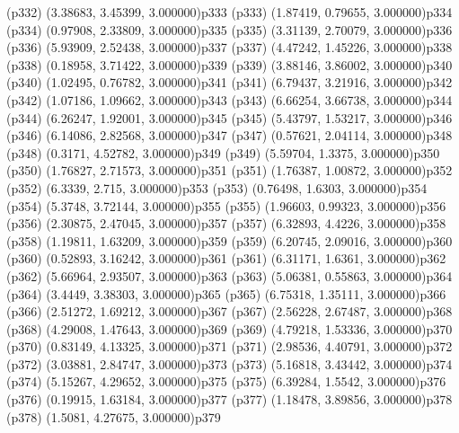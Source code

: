 \psdot(p332)
\psPoint(3.38683, 3.45399, 3.000000){p333}
\psdot(p333)
\psPoint(1.87419, 0.79655, 3.000000){p334}
\psdot(p334)
\psPoint(0.97908, 2.33809, 3.000000){p335}
\psdot(p335)
\psPoint(3.31139, 2.70079, 3.000000){p336}
\psdot(p336)
\psPoint(5.93909, 2.52438, 3.000000){p337}
\psdot(p337)
\psPoint(4.47242, 1.45226, 3.000000){p338}
\psdot(p338)
\psPoint(0.18958, 3.71422, 3.000000){p339}
\psdot(p339)
\psPoint(3.88146, 3.86002, 3.000000){p340}
\psdot(p340)
\psPoint(1.02495, 0.76782, 3.000000){p341}
\psdot(p341)
\psPoint(6.79437, 3.21916, 3.000000){p342}
\psdot(p342)
\psPoint(1.07186, 1.09662, 3.000000){p343}
\psdot(p343)
\psPoint(6.66254, 3.66738, 3.000000){p344}
\psdot(p344)
\psPoint(6.26247, 1.92001, 3.000000){p345}
\psdot(p345)
\psPoint(5.43797, 1.53217, 3.000000){p346}
\psdot(p346)
\psPoint(6.14086, 2.82568, 3.000000){p347}
\psdot(p347)
\psPoint(0.57621, 2.04114, 3.000000){p348}
\psdot(p348)
\psPoint(0.3171, 4.52782, 3.000000){p349}
\psdot(p349)
\psPoint(5.59704, 1.3375, 3.000000){p350}
\psdot(p350)
\psPoint(1.76827, 2.71573, 3.000000){p351}
\psdot(p351)
\psPoint(1.76387, 1.00872, 3.000000){p352}
\psdot(p352)
\psPoint(6.3339, 2.715, 3.000000){p353}
\psdot(p353)
\psPoint(0.76498, 1.6303, 3.000000){p354}
\psdot(p354)
\psPoint(5.3748, 3.72144, 3.000000){p355}
\psdot(p355)
\psPoint(1.96603, 0.99323, 3.000000){p356}
\psdot(p356)
\psPoint(2.30875, 2.47045, 3.000000){p357}
\psdot(p357)
\psPoint(6.32893, 4.4226, 3.000000){p358}
\psdot(p358)
\psPoint(1.19811, 1.63209, 3.000000){p359}
\psdot(p359)
\psPoint(6.20745, 2.09016, 3.000000){p360}
\psdot(p360)
\psPoint(0.52893, 3.16242, 3.000000){p361}
\psdot(p361)
\psPoint(6.31171, 1.6361, 3.000000){p362}
\psdot(p362)
\psPoint(5.66964, 2.93507, 3.000000){p363}
\psdot(p363)
\psPoint(5.06381, 0.55863, 3.000000){p364}
\psdot(p364)
\psPoint(3.4449, 3.38303, 3.000000){p365}
\psdot(p365)
\psPoint(6.75318, 1.35111, 3.000000){p366}
\psdot(p366)
\psPoint(2.51272, 1.69212, 3.000000){p367}
\psdot(p367)
\psPoint(2.56228, 2.67487, 3.000000){p368}
\psdot(p368)
\psPoint(4.29008, 1.47643, 3.000000){p369}
\psdot(p369)
\psPoint(4.79218, 1.53336, 3.000000){p370}
\psdot(p370)
\psPoint(0.83149, 4.13325, 3.000000){p371}
\psdot(p371)
\psPoint(2.98536, 4.40791, 3.000000){p372}
\psdot(p372)
\psPoint(3.03881, 2.84747, 3.000000){p373}
\psdot(p373)
\psPoint(5.16818, 3.43442, 3.000000){p374}
\psdot(p374)
\psPoint(5.15267, 4.29652, 3.000000){p375}
\psdot(p375)
\psPoint(6.39284, 1.5542, 3.000000){p376}
\psdot(p376)
\psPoint(0.19915, 1.63184, 3.000000){p377}
\psdot(p377)
\psPoint(1.18478, 3.89856, 3.000000){p378}
\psdot(p378)
\psPoint(1.5081, 4.27675, 3.000000){p379}
